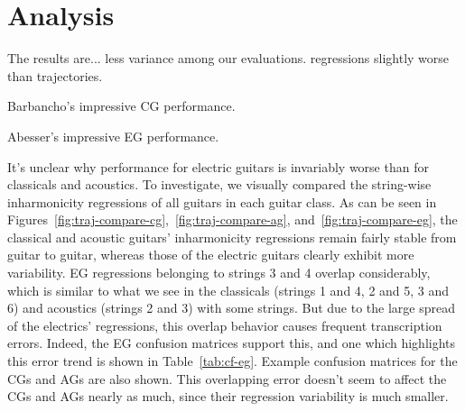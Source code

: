 \documentclass[12pt]{cmuthesis}
\begin{document}
\section{Analysis}
The results are... 
less variance among our evaluations.
regressions slightly worse than trajectories.

Barbancho's impressive CG performance.

Abesser's impressive EG performance.

It's unclear why performance for electric guitars is invariably worse than for classicals and acoustics. To investigate, we visually compared the string-wise inharmonicity regressions of all guitars in each guitar class. As can be seen in Figures~\ref{fig:traj-compare-cg},~\ref{fig:traj-compare-ag}, and~\ref{fig:traj-compare-eg}, the classical and acoustic guitars' inharmonicity regressions remain fairly stable from guitar to guitar, whereas those of the electric guitars clearly exhibit more variability. EG regressions belonging to strings 3 and 4 overlap considerably, which is similar to what we see in the classicals (strings 1 and 4, 2 and 5, 3 and 6) and acoustics (strings 2 and 3) with some strings. But due to the large spread of the electrics' regressions, this overlap behavior causes frequent transcription errors. Indeed, the EG confusion matrices support this, and one which highlights this error trend is shown in Table~\ref{tab:cf-eg}. Example confusion matrices for the CGs and AGs are also shown. This overlapping error doesn't seem to affect the CGs and AGs nearly as much, since their regression variability is much smaller.
\end{document}
